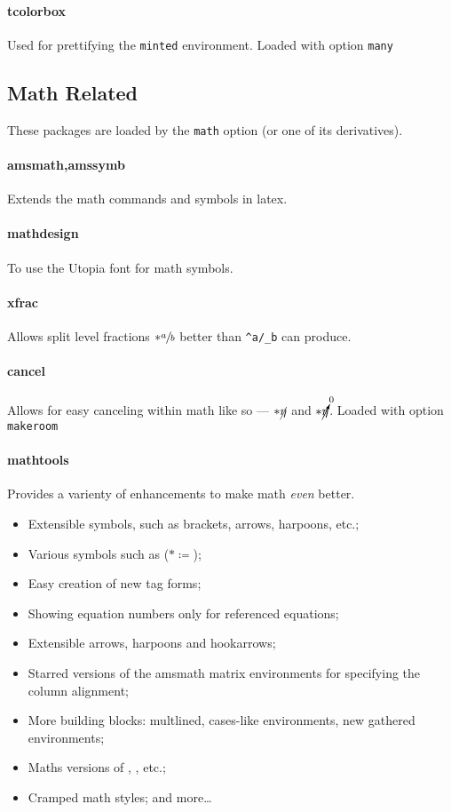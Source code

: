 \documentclass[solid,math,chem,code,plot,gloss]{bmc}
\begin{document}
\paragraph{\ttfamily tcolorbox}\label{par:tcolorbox}
Used for prettifying the \texttt{minted} environment.
Loaded with option \texttt{many}

\subsection{Math Related}
These packages are loaded by the \texttt{math}
option (or one of its derivatives).

\paragraph{\ttfamily amsmath,amssymb}\label{par:amssymb}
Extends the math commands and symbols in latex.
\paragraph{\ttfamily mathdesign}\label{par:mathdesign}
To use the Utopia font for math symbols.
\paragraph{\ttfamily xfrac}\label{par:xfrac}
Allows split level fractions \(*\sfrac{a}{b}\) better than \texttt{{}^{a}/{}_{b}} can produce.
\paragraph{\ttfamily cancel}\label{par:cancel}
Allows for easy canceling within math like so ---
\(*\cancel{\eta}\) and \(*\cancelto{0}{\eta}\).
Loaded with option \texttt{makeroom}
\paragraph{\ttfamily mathtools}\label{par:mathtools}
Provides a varienty of enhancements to make math \emph{even} better.
\begin{itemize}
    \item Extensible symbols, such as brackets, arrows, harpoons, etc.;
    \item Various symbols such as \texttt{\coloneqq} (\(*\coloneqq\));
    \item Easy creation of new tag forms;
    \item Showing equation numbers only for referenced equations;
    \item Extensible arrows, harpoons and hookarrows;
    \item Starred versions of the amsmath matrix environments for specifying the column alignment;
    \item More building blocks: multlined, cases-like environments, new gathered environments;
    \item Maths versions of \texttt{\makebox}, \texttt{\llap}, \texttt{\rlap} etc.;
    \item Cramped math styles; and more\dots
\end{itemize}
\end{document}
